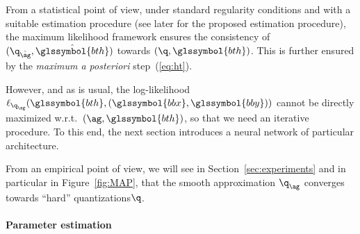 From a statistical point of view, 
under standard regularity conditions and with a suitable estimation procedure (see later for the proposed estimation procedure), the maximum likelihood framework ensures the consistency of $(\q_{\hat{\ag}}, \hat{\glssymbol{bth}})$ towards $(\q,\glssymbol{bth})$. This is further ensured by the \textit{maximum a posteriori} step~(\ref{eq:ht}).

However, and as is usual, the log-likelihood $\ell_{\q_{\ag}}(\glssymbol{bth},(\glssymbol{bbx},\glssymbol{bby}))$ cannot be directly maximized w.r.t.\ $(\ag,\glssymbol{bth})$, so that we need an iterative procedure. To this end, the next section introduces a neural network of particular architecture.

From an empirical point of view, we will see in Section~\ref{sec:experiments} and in particular in Figure~\ref{fig:MAP}, that the smooth approximation $\q_{\ag}$ converges towards ``hard'' quantizations\footnotemark[1] $\q$.




\paragraph{Parameter estimation}

